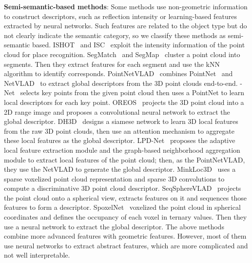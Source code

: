 \documentclass[letterpaper, 10 pt, conference]{ieeeconf}
\begin{document}
\textbf{Semi-semantic-based methods}: Some methods use non-geometric information to construct descriptors, such as reflection intensity or learning-based features extracted by neural networks. Such features are related to the object type but do not clearly indicate the semantic category, so we classify these methods as semi-semantic based. ISHOT~\cite{ISHOT} and ISC~\cite{ISC} exploit the intensity information of the point cloud for place recognition. SegMatch~\cite{segmatch} and SegMap~\cite{segmap2} cluster a point cloud into segments. Then they extract features for each segment and use the kNN algorithm to identify corresponds. PointNetVLAD~\cite{PV} combines PointNet~\cite{pointnet} and NetVLAD~\cite{netvlad} to extract global descriptors from the 3D point clouds end-to-end. -Net~\cite{l3net} selects key points from the given point cloud then uses a PointNet to learn local descriptors for each key point. OREOS~\cite{oreos} projects the 3D point cloud into a 2D range image and proposes a convolutional neural network to extract the global descriptor. DH3D~\cite{dh3d} designs a siamese network to learn 3D local features from the raw 3D point clouds, then use an attention mechanism to aggregate these local features as the global descriptor. LPD-Net~\cite{lpdnet} proposes the adaptive local feature extraction module and the graph-based neighborhood aggregation module to extract local features of the point cloud; then, as the PointNetVLAD, they use the NetVLAD to generate the global descriptor. MinkLoc3D~\cite{minlock3d} uses a sparse voxelized point cloud representation and sparse 3D convolutions to compute a discriminative 3D point cloud descriptor. SeqSphereVLAD~\cite{SeqSphereVLAD} projects the point cloud onto a spherical view, extracts features on it and sequences those features to form a descriptor. SpoxelNet~\cite{spoxenet} voxelized the point cloud in spherical coordinates and defines the occupancy of each voxel in ternary values. Then they use a neural network to extract the global descriptor. The above methods combine more advanced features with geometric features. However, most of them use neural networks to extract abstract features, which are more complicated and not well interpretable.
\end{document}
